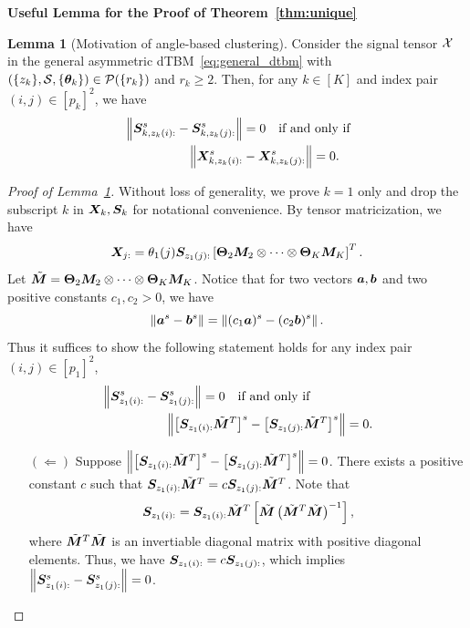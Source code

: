 \documentclass[journal]{IEEEtran}
\theoremstyle{definition}
\newtheorem{lem}{Lemma}
\theoremstyle{definition}
\newcommand{\of}[1]{\left(#1\right)}
\newcommand{\off}[1]{\left[#1\right]}
\begin{document}
{\bf Useful Lemma for the Proof of Theorem~\ref{thm:unique}} 

\begin{lem}[Motivation of angle-based clustering]\label{lem:angle} Consider the signal tensor $\mathcal{X}$ in the general asymmetric dTBM~\eqref{eq:general_dtbm} with $(\{z_k\},\mathcal{S},\{\boldsymbol{\theta}_k\})\in \mathcal{P}(\{r_k\})$ and $r_k \geq 2$. Then, for any $k \in [K]$ and index pair $(i,j)\in[p_k]^2$, we have 
\begin{align}
     & \left\lVert \bm S_{k,z_k(i):}^s -  \bm S_{k,z_k(j):}^s \right\rVert = 0 \quad  \text{if and only if} \\
    & \quad \quad \quad \quad \quad  \left\lVert  \bm X_{k, z_k(i):}^s -  \bm X_{k,z_k(j):}^s \right\rVert = 0.
\end{align}
\end{lem}

\begin{proof}[Proof of Lemma~\ref{lem:angle}] Without loss of generality, we prove $k = 1$ only and drop the subscript $k$ in $\bm X_k, \bm S_k$ for notational convenience. 
By tensor matricization, we have
\begin{equation}
    \mX_{j:} = \theta_1(j) \mS_{z_1(j):} \off{\mTheta_2 \mM_2 \otimes \cdots \otimes \mTheta_K \mM_K}^T.
\end{equation}     
Let $\tilde {\bm M} = \boldsymbol{\Theta}_2 \bm M_2 \otimes \cdots \otimes \boldsymbol{\Theta}_K \bm M_K$. Notice that for two vectors $\bm{a}, \bm{b}$ and two positive constants $c_1, c_2 >0$, we have
\begin{equation}
\left\lVert\bm{a}^s - \bm{b}^s\right\rVert = \left\lVert(c_1 \bm{a})^s - (c_2\bm{b})^s\right\rVert.
\end{equation}
Thus it suffices to show the following statement holds for any index pair $(i,j)\in[p_1]^2$,
\begin{align}
    &\onorm{ \mS_{z_1(i):}^s - \mS_{z_1(j):}^s} = 0 \quad \text{if and only if} \\
    & \quad \quad \quad \quad \quad \onorm{ \off{\mS_{z_1(i):} \tilde \mM^T }^s - \off{\mS_{z_1(j):}\tilde \mM^T}^s} = 0.
\end{align}
\begin{enumerate}[wide]
    \item[$(\Leftarrow)$] Suppose $\onorm{ \off{\mS_{z_1(i):} \tilde \mM^T }^s - \off{\mS_{z_1(j):}\tilde \mM^T}^s} = 0$. There exists a positive constant $c$ such that $\bm S_{z_1(i):} \tilde {\bm M}^T= c \bm S_{z_1(j):} \tilde {\bm M}^T$. Note that
\begin{equation}
    \mS_{z_1(i):} = \mS_{z_1(i):} \tilde \mM^T \off{ \tilde \mM \of{ \tilde \mM^T  \tilde \mM}^{-1}},
\end{equation}
where $ \tilde {\bm M}^T  \tilde {\bm M}$ is an invertiable diagonal matrix with positive diagonal elements. Thus, we have $ \bm S_{z_1(i):} = c  \bm S_{z_1(j):}$, which implies $ \left\lVert  \bm S_{z_1(i):}^s -  \bm S_{z_1(j):}^s \right\rVert = 0 $.


\end{enumerate}
\end{proof}
\end{document}
